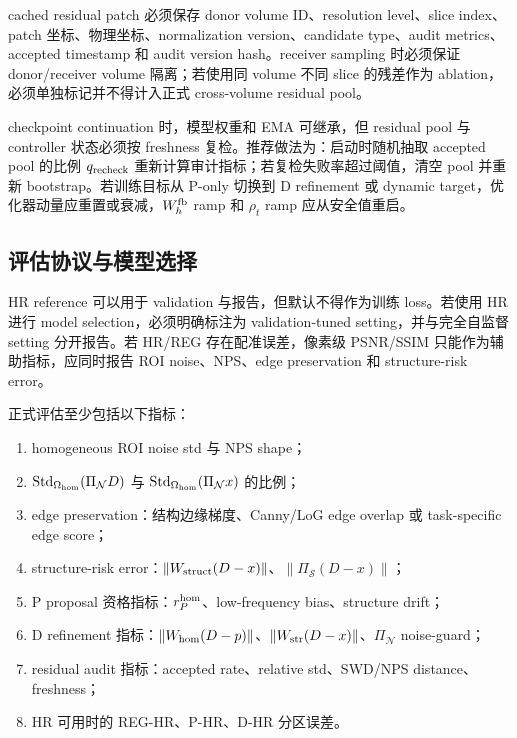 \documentclass[11pt,a4paper,UTF8,fontset=fandol]{ctexart}
\theoremstyle{definition}
\DeclareMathOperator{\Std}{Std}
\newcommand{\norm}[1]{\left\lVert#1\right\rVert}
\begin{document}
cached residual patch 必须保存 donor volume ID、resolution level、slice index、patch 坐标、物理坐标、normalization version、candidate type、audit metrics、accepted timestamp 和 audit version hash。receiver sampling 时必须保证 donor/receiver volume 隔离；若使用同 volume 不同 slice 的残差作为 ablation，必须单独标记并不得计入正式 cross-volume residual pool。

checkpoint continuation 时，模型权重和 EMA 可继承，但 residual pool 与 controller 状态必须按 freshness 复检。推荐做法为：启动时随机抽取 accepted pool 的比例 $q_{\rm recheck}$ 重新计算审计指标；若复检失败率超过阈值，清空 pool 并重新 bootstrap。若训练目标从 P-only 切换到 D refinement 或 dynamic target，优化器动量应重置或衰减，$W_h^{\rm fb}$ ramp 和 $\rho_t$ ramp 应从安全值重启。

\subsection{评估协议与模型选择}
\label{subsec:evaluation-protocol-full}

HR reference 可以用于 validation 与报告，但默认不得作为训练 loss。若使用 HR 进行 model selection，必须明确标注为 validation-tuned setting，并与完全自监督 setting 分开报告。若 HR/REG 存在配准误差，像素级 PSNR/SSIM 只能作为辅助指标，应同时报告 ROI noise、NPS、edge preservation 和 structure-risk error。

正式评估至少包括以下指标：
\begin{enumerate}[leftmargin=2em]
    \item homogeneous ROI noise std 与 NPS shape；
    \item $\Std_{\Omega_{\rm hom}}(\Pi_{\mathcal N}D)$ 与 $\Std_{\Omega_{\rm hom}}(\Pi_{\mathcal N}x)$ 的比例；
    \item edge preservation：结构边缘梯度、Canny/LoG edge overlap 或 task-specific edge score；
    \item structure-risk error：$\norm{W_{\rm struct}(D-x)}$、$\norm{\Pi_{\mathcal S}(D-x)}$；
    \item P proposal 资格指标：$r_P^{\rm hom}$、low-frequency bias、structure drift；
    \item D refinement 指标：$\norm{W_{\rm hom}(D-p)}$、$\norm{W_{\rm str}(D-x)}$、$\Pi_{\mathcal N}$ noise-guard；
    \item residual audit 指标：accepted rate、relative std、SWD/NPS distance、freshness；
    \item HR 可用时的 REG-HR、P-HR、D-HR 分区误差。
\end{enumerate}
\end{document}
